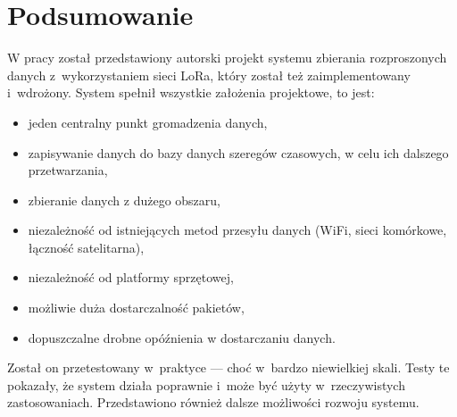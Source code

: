 \chapter*{Podsumowanie}

W pracy został przedstawiony autorski projekt systemu zbierania rozproszonych danych z~wykorzystaniem sieci LoRa, który został też zaimplementowany i~wdrożony. System spełnił wszystkie założenia projektowe, to jest:
\begin{itemize}
    \item jeden centralny punkt gromadzenia danych,
    \item zapisywanie danych do bazy danych szeregów czasowych, w celu ich dalszego przetwarzania,
    \item zbieranie danych z dużego obszaru,
    \item niezależność od istniejących metod przesyłu danych (WiFi, sieci komórkowe, łączność satelitarna),
    \item niezależność od platformy sprzętowej,
    \item możliwie duża dostarczalność pakietów,
    \item dopuszczalne drobne opóźnienia w dostarczaniu danych.
\end{itemize}

Został on przetestowany w~praktyce — choć w~bardzo niewielkiej skali. Testy te pokazały, że system działa poprawnie i~może być użyty w~rzeczywistych zastosowaniach. Przedstawiono również dalsze możliwości rozwoju systemu.
